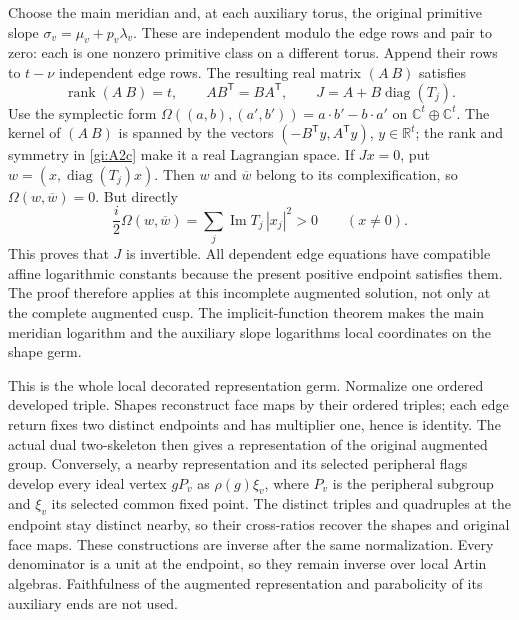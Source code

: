 Choose the main meridian and, at each auxiliary torus, the original
primitive slope \(\sigma_v=\mu_v+p_v\lambda_v\). These are independent
modulo the edge rows and pair to zero: each is one nonzero primitive
class on a different torus. Append their rows to \(t-\nu\) independent
edge rows. The resulting real matrix \((A\ B)\) satisfies \begin{equation}\label{gi:A2c}
\operatorname{rank}(A\ B)=t,\qquad AB^{\mathsf T}=BA^{\mathsf T},
 \qquad J=A+B\operatorname{diag}(T_j).
\end{equation} Use the symplectic form
\(\Omega((a,b),(a',b'))=a\cdot b'-b\cdot a'\) on
\(\mathbb C^t\oplus\mathbb C^t\). The kernel of \((A\ B)\) is
spanned by the vectors \((-B^{\mathsf T}y,A^{\mathsf T}y)\), \(y\in\mathbb R^t\);
the rank and symmetry in \eqref{gi:A2c} make it a real Lagrangian space.
If \(Jx=0\), put \(w=(x,\operatorname{diag}(T_j)x)\).
Then \(w\) and \(\overline w\) belong to its complexification,
so \(\Omega(w,\overline w)=0\). But directly \begin{equation}\label{gi:A2d}
\frac{i}{2}\Omega(w,\overline w)=\sum_j\operatorname{Im}T_j\,|x_j|^2>0
                         \qquad(x\ne0).
\end{equation} This proves that \(J\) is invertible. All dependent edge equations have compatible
affine logarithmic constants because the present positive endpoint
satisfies them. The proof therefore applies at this incomplete augmented
solution, not only at the complete augmented cusp. The implicit-function
theorem makes the main meridian logarithm and the auxiliary slope
logarithms local coordinates on the shape germ.

This is the whole local decorated representation germ. Normalize one
ordered developed triple. Shapes reconstruct face maps by their ordered
triples; each edge return fixes two distinct endpoints and has
multiplier one, hence is identity. The actual dual two-skeleton then
gives a representation of the original augmented group. Conversely, a
nearby representation and its selected peripheral flags develop every
ideal vertex \(gP_v\) as \(\rho(g)\xi_v\), where \(P_v\) is the peripheral subgroup and \(\xi_v\) its selected common fixed point. The distinct triples and
quadruples at the endpoint stay distinct nearby, so their cross-ratios
recover the shapes and original face maps. These constructions are
inverse after the same normalization. Every denominator is a unit at the
endpoint, so they remain inverse over local Artin algebras. Faithfulness
of the augmented representation and parabolicity of its auxiliary ends
are not used.

